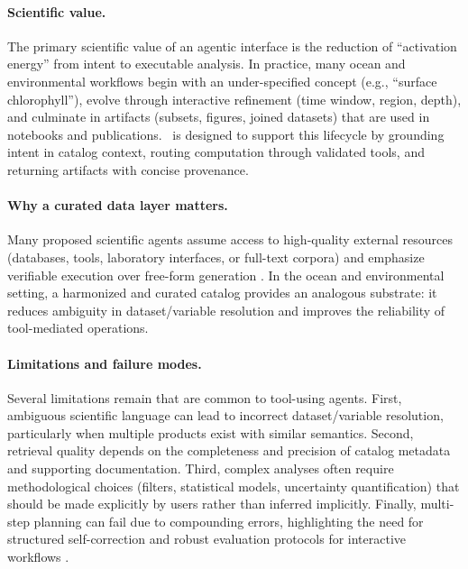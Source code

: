 \paragraph{Scientific value.}
The primary scientific value of an agentic interface is the reduction of ``activation energy'' from intent to executable analysis.
In practice, many ocean and environmental workflows begin with an under-specified concept (e.g., ``surface chlorophyll''), evolve through interactive refinement (time window, region, depth), and culminate in artifacts (subsets, figures, joined datasets) that are used in notebooks and publications.
\cmapagent\ is designed to support this lifecycle by grounding intent in catalog context, routing computation through validated tools, and returning artifacts with concise provenance.

\paragraph{Why a curated data layer matters.}
Many proposed scientific agents assume access to high-quality external resources (databases, tools, laboratory interfaces, or full-text corpora) and emphasize verifiable execution over free-form generation \citep{Bran2024ChemCrow,Boiko2023Coscientist,Lala2023PaperQA}.
In the ocean and environmental setting, a harmonized and curated catalog provides an analogous substrate: it reduces ambiguity in dataset/variable resolution and improves the reliability of tool-mediated operations.

\paragraph{Limitations and failure modes.}
Several limitations remain that are common to tool-using agents.
First, ambiguous scientific language can lead to incorrect dataset/variable resolution, particularly when multiple products exist with similar semantics.
Second, retrieval quality depends on the completeness and precision of catalog metadata and supporting documentation.
Third, complex analyses often require methodological choices (filters, statistical models, uncertainty quantification) that should be made explicitly by users rather than inferred implicitly.
Finally, multi-step planning can fail due to compounding errors, highlighting the need for structured self-correction and robust evaluation protocols for interactive workflows \citep{Liu2023AgentBench,Zhang2024DSEval}.

